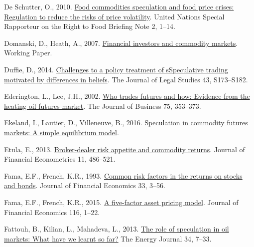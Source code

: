 \documentclass[]{elsarticle} %
\newlength{\cslhangindent}
\newlength{\cslentryspacingunit} %
\newenvironment{CSLReferences}[2] %
 {%
  \setlength{\parindent}{0pt}
  \ifodd #1
  \let\oldpar\par
  \def\par{\hangindent=\cslhangindent\oldpar}
  \fi
  \setlength{\parskip}{#2\cslentryspacingunit}
 }%
 {}
\begin{document}
\begin{CSLReferences}{1}{0}
\leavevmode{}%
De Schutter, O., 2010. \href{https://www2.ohchr.org/english/issues/food/docs/briefing_note_02_september_2010_en.pdf}{Food commodities speculation and food price crises: Regulation to reduce the risks of price volatility}. United Nations Special Rapporteur on the Right to Food Briefing Note 2, 1--14.

\leavevmode{}%
Domanski, D., Heath, A., 2007. \href{https://www.bis.org/publ/qtrpdf/r_qt0703g.pdf}{Financial investors and commodity markets}. Working Paper.

\leavevmode{}%
Duffie, D., 2014. \href{https://doi.org/10.1086/677836}{Challenges to a policy treatment of sSpeculative trading motivated by differences in beliefs}. The Journal of Legal Studies 43, S173--S182.

\leavevmode{}%
Ederington, L., Lee, J.H., 2002. \href{https://doi.org/10.1086/338706}{Who trades futures and how: Evidence from the heating oil futures market}. The Journal of Business 75, 353--373.

\leavevmode{}%
Ekeland, I., Lautier, D., Villeneuve, B., 2016. \href{https://hal.archives-ouvertes.fr/hal-01655848}{Speculation in commodity futures markets: A simple equilibrium model}.

\leavevmode{}%
Etula, E., 2013. \href{https://doi.org/10.1093/jjfinec/nbs024}{Broker-dealer risk appetite and commodity returns}. Journal of Financial Econometrics 11, 486--521.

\leavevmode{}%
Fama, E.F., French, K.R., 1993. \href{https://doi.org/10.1016/0304-405X(93)90023-5}{Common risk factors in the returns on stocks and bonds}. Journal of Financial Economics 33, 3--56.

\leavevmode{}%
Fama, E.F., French, K.R., 2015. \href{https://doi.org/10.1016/j.jfineco.2014.10.010}{A five-factor asset pricing model}. Journal of Financial Economics 116, 1--22.

\leavevmode{}%
Fattouh, B., Kilian, L., Mahadeva, L., 2013. \href{https://www.jstor.org/stable/41970495}{The role of speculation in oil markets: What have we learnt so far?} The Energy Journal 34, 7--33.


\end{CSLReferences}
\end{document}
